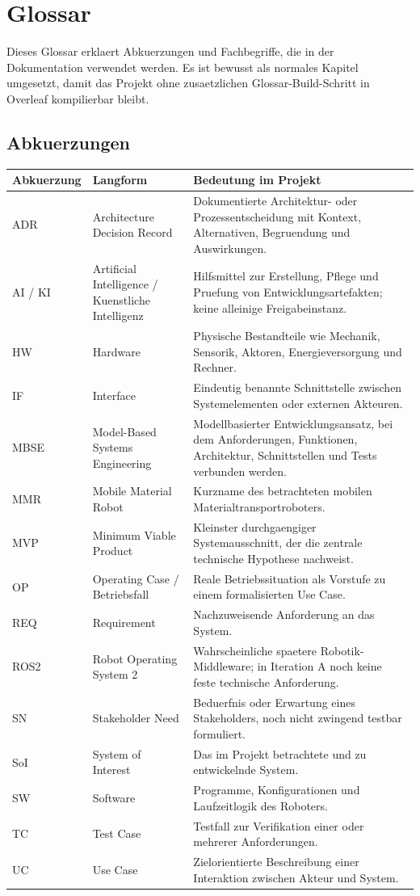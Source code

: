 \chapter{Glossar}
\label{chap:glossar}

Dieses Glossar erklaert Abkuerzungen und Fachbegriffe, die in der Dokumentation verwendet werden. Es ist bewusst als normales Kapitel umgesetzt, damit das Projekt ohne zusaetzlichen Glossar-Build-Schritt in Overleaf kompilierbar bleibt.

\section{Abkuerzungen}

\begin{longtable}{L{0.20\textwidth} L{0.30\textwidth} L{0.36\textwidth}}
\toprule
Abkuerzung & Langform & Bedeutung im Projekt \\
\midrule
ADR & Architecture Decision Record & Dokumentierte Architektur- oder Prozessentscheidung mit Kontext, Alternativen, Begruendung und Auswirkungen. \\
AI / KI & Artificial Intelligence / Kuenstliche Intelligenz & Hilfsmittel zur Erstellung, Pflege und Pruefung von Entwicklungsartefakten; keine alleinige Freigabeinstanz. \\
HW & Hardware & Physische Bestandteile wie Mechanik, Sensorik, Aktoren, Energieversorgung und Rechner. \\
IF & Interface & Eindeutig benannte Schnittstelle zwischen Systemelementen oder externen Akteuren. \\
MBSE & Model-Based Systems Engineering & Modellbasierter Entwicklungsansatz, bei dem Anforderungen, Funktionen, Architektur, Schnittstellen und Tests verbunden werden. \\
MMR & Mobile Material Robot & Kurzname des betrachteten mobilen Materialtransportroboters. \\
MVP & Minimum Viable Product & Kleinster durchgaengiger Systemausschnitt, der die zentrale technische Hypothese nachweist. \\
OP & Operating Case / Betriebsfall & Reale Betriebssituation als Vorstufe zu einem formalisierten Use Case. \\
REQ & Requirement & Nachzuweisende Anforderung an das System. \\
ROS2 & Robot Operating System 2 & Wahrscheinliche spaetere Robotik-Middleware; in Iteration A noch keine feste technische Anforderung. \\
SN & Stakeholder Need & Beduerfnis oder Erwartung eines Stakeholders, noch nicht zwingend testbar formuliert. \\
SoI & System of Interest & Das im Projekt betrachtete und zu entwickelnde System. \\
SW & Software & Programme, Konfigurationen und Laufzeitlogik des Roboters. \\
TC & Test Case & Testfall zur Verifikation einer oder mehrerer Anforderungen. \\
UC & Use Case & Zielorientierte Beschreibung einer Interaktion zwischen Akteur und System. \\
\bottomrule
\end{longtable}

